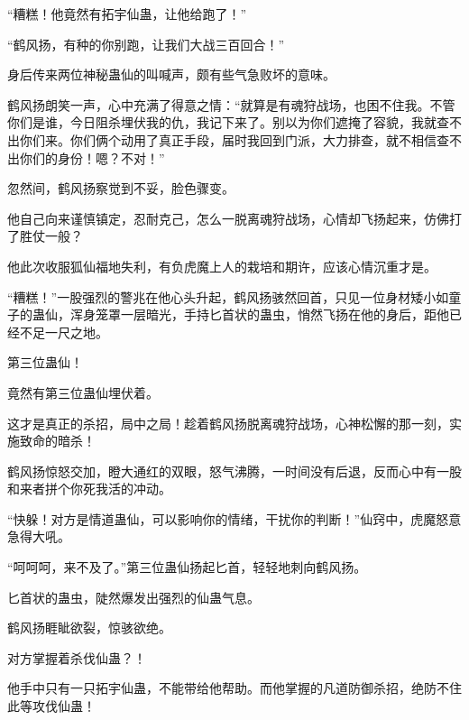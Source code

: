 \begin{this_body}
“糟糕！他竟然有拓宇仙蛊，让他给跑了！”

“鹤风扬，有种的你别跑，让我们大战三百回合！”

身后传来两位神秘蛊仙的叫喊声，颇有些气急败坏的意味。

鹤风扬朗笑一声，心中充满了得意之情：“就算是有魂狩战场，也困不住我。不管你们是谁，今日阻杀埋伏我的仇，我记下来了。别以为你们遮掩了容貌，我就查不出你们来。你们俩个动用了真正手段，届时我回到门派，大力排查，就不相信查不出你们的身份！嗯？不对！”

忽然间，鹤风扬察觉到不妥，脸色骤变。

他自己向来谨慎镇定，忍耐克己，怎么一脱离魂狩战场，心情却飞扬起来，仿佛打了胜仗一般？

他此次收服狐仙福地失利，有负虎魔上人的栽培和期许，应该心情沉重才是。

“糟糕！”一股强烈的警兆在他心头升起，鹤风扬骇然回首，只见一位身材矮小如童子的蛊仙，浑身笼罩一层暗光，手持匕首状的蛊虫，悄然飞扬在他的身后，距他已经不足一尺之地。

第三位蛊仙！

竟然有第三位蛊仙埋伏着。

这才是真正的杀招，局中之局！趁着鹤风扬脱离魂狩战场，心神松懈的那一刻，实施致命的暗杀！

鹤风扬惊怒交加，瞪大通红的双眼，怒气沸腾，一时间没有后退，反而心中有一股和来者拼个你死我活的冲动。

“快躲！对方是情道蛊仙，可以影响你的情绪，干扰你的判断！”仙窍中，虎魔怒意急得大吼。

“呵呵呵，来不及了。”第三位蛊仙扬起匕首，轻轻地刺向鹤风扬。

匕首状的蛊虫，陡然爆发出强烈的仙蛊气息。

鹤风扬睚眦欲裂，惊骇欲绝。

对方掌握着杀伐仙蛊？！

他手中只有一只拓宇仙蛊，不能带给他帮助。而他掌握的凡道防御杀招，绝防不住此等攻伐仙蛊！

\end{this_body}

